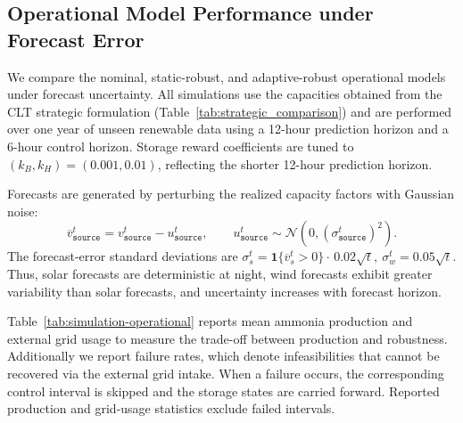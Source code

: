 \documentclass[11pt, letter]{article}
\begin{document}
\subsection{Operational Model Performance under Forecast Error}

We compare the nominal, static-robust, and adaptive-robust operational models under forecast uncertainty. All simulations use the capacities obtained from the CLT strategic formulation (Table~\ref{tab:strategic_comparison}) and are performed over one year of unseen renewable data using a 12-hour prediction horizon and a 6-hour control horizon. Storage reward coefficients are tuned to $(k_B,k_H)=(0.001,0.01)$, reflecting the shorter 12-hour prediction horizon.

Forecasts are generated by perturbing the realized capacity factors with Gaussian noise:
\[
\overline{v}_{\texttt{source}}^{t}
=
v_{\texttt{source}}^{t}
-
u_{\texttt{source}}^{t},
\qquad
u_{\texttt{source}}^{t}
\sim
\mathcal N\!\left(0,(\sigma_{\texttt{source}}^t)^2\right).
\]
The forecast-error standard deviations are
\(
\sigma_s^t
=
\mathbf{1}{\{\overline v_s^t>0\}}\cdot\,0.02\sqrt t, \
\sigma_w^t
=
0.05\sqrt t.
\)
Thus, solar forecasts are deterministic at night, wind forecasts exhibit greater variability than solar forecasts, and uncertainty increases with forecast horizon.

Table~\ref{tab:simulation-operational} reports mean ammonia production and external grid usage to measure the trade-off between production and robustness. Additionally we report failure rates, which denote infeasibilities that cannot be recovered via the external grid intake. When a failure occurs, the corresponding control interval is skipped and the storage states are carried forward. Reported production and grid-usage statistics exclude failed intervals.
\end{document}
